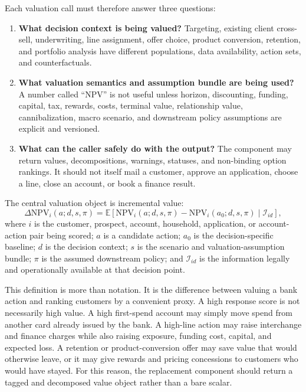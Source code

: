 \documentclass[11pt]{article}
\newcommand{\E}{\mathbb{E}}
\newcommand{\NPV}{\mathrm{NPV}}
\newcommand{\1}{\mathbf{1}}
\begin{document}
Each valuation call must therefore answer three questions:
\begin{enumerate}[label=\arabic*.]
  \item \textbf{What decision context is being valued?} Targeting, existing
        client cross-sell, underwriting, line assignment, offer choice, product
        conversion, retention, and portfolio analysis have different
        populations, data availability, action sets, and counterfactuals.
  \item \textbf{What valuation semantics and assumption bundle are being used?}
        A number called ``NPV'' is not useful unless horizon, discounting,
        funding, capital, tax, rewards, costs, terminal value, relationship
        value, cannibalization, macro scenario, and downstream policy
        assumptions are explicit and versioned.
  \item \textbf{What can the caller safely do with the output?} The component
        may return values, decompositions, warnings, statuses, and
        non-binding option rankings. It should not itself mail a customer,
        approve an application, choose a line, close an account, or book a
        finance result.
\end{enumerate}

The central valuation object is incremental value:
\begin{equation}
  \Delta \NPV_i(a;d,s,\pi)
  =
  \E\left[
    \NPV_i(a;d,s,\pi)-\NPV_i(a_0;d,s,\pi)
    \mid \mathcal{I}_{id}
  \right],
  \label{eq:proposal-objective}
\end{equation}
where $i$ is the customer, prospect, account, household, application, or
account-action pair being scored; $a$ is a candidate action; $a_0$ is the
decision-specific baseline; $d$ is the decision context; $s$ is the scenario
and valuation-assumption bundle; $\pi$ is the assumed downstream policy; and
$\mathcal{I}_{id}$ is the information legally and operationally available at
that decision point.

This definition is more than notation. It is the difference between valuing a
bank action and ranking customers by a convenient proxy. A high response score
is not necessarily high value. A high first-spend account may simply move spend
from another card already issued by the bank. A high-line action may raise
interchange and finance charges while also raising exposure, funding cost,
capital, and expected loss. A retention or product-conversion offer may save
value that would otherwise leave, or it may give rewards and pricing
concessions to customers who would have stayed. For this reason, the replacement
component should return a tagged and decomposed value object rather than a bare
scalar.
\end{document}
